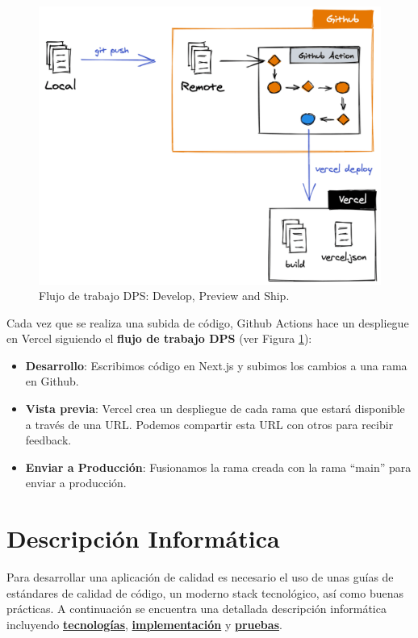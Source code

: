 \documentclass[12pt,twoside,titlepage]{report}
\begin{document}
\begin{figure}[H]
    \centering
    \includegraphics[scale=0.3]{DevOps/DPS}
    \caption{Flujo de trabajo DPS: Develop, Preview and Ship.}
    \label{fig:vercel_workflow}
\end{figure}

Cada vez que se realiza una subida de código, Github Actions hace un despliegue en Vercel siguiendo el \textbf{flujo de trabajo DPS} \cite{dps} (ver Figura \ref{fig:vercel_workflow}):

\begin{itemize}
    \item \textbf{Desarrollo}: Escribimos código en Next.js y subimos los cambios a una rama en Github.
    \item \textbf{Vista previa}: Vercel crea un despliegue de cada rama que estará disponible a través de una URL. Podemos compartir esta URL con otros para recibir feedback. 
    \item \textbf{Enviar a Producción}: Fusionamos la rama creada con la rama ``main'' para enviar a producción.
\end{itemize}


\chapter{Descripción Informática}
\label{sec:desarrollo}

Para desarrollar una aplicación de calidad es necesario el uso de unas guías de estándares de calidad de código, un moderno stack tecnológico, así como buenas prácticas. A continuación se encuentra una detallada descripción informática incluyendo \hyperref[sec:stack]{\textbf{tecnologías}}, \hyperref[sec:implementacion]{\textbf{implementación}} y \hyperref[sec:pruebas]{\textbf{pruebas}}.
\end{document}
